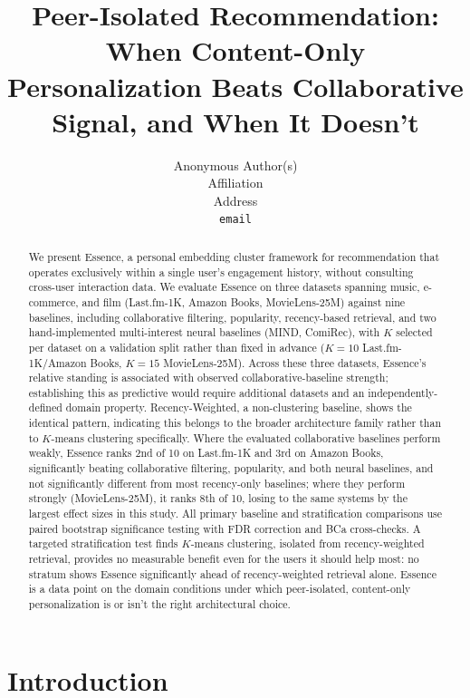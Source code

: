 \documentclass{article}
\title{Peer-Isolated Recommendation: When Content-Only Personalization Beats Collaborative Signal, and When It Doesn't\footnotemark}
\author{%
  Anonymous Author(s) \\
  Affiliation \\
  Address \\
  \texttt{email}
}
\begin{document}
\maketitle
{}

\begin{abstract}
We present Essence, a personal embedding cluster framework for recommendation that operates exclusively within a single user's engagement history, without consulting cross-user interaction data. We evaluate Essence on three datasets spanning music, e-commerce, and film (Last.fm-1K, Amazon Books, MovieLens-25M) against nine baselines, including collaborative filtering, popularity, recency-based retrieval, and two hand-implemented multi-interest neural baselines (MIND, ComiRec), with $K$ selected per dataset on a validation split rather than fixed in advance ($K=10$ Last.fm-1K/Amazon Books, $K=15$ MovieLens-25M). Across these three datasets, Essence's relative standing is associated with observed collaborative-baseline strength; establishing this as predictive would require additional datasets and an independently-defined domain property. Recency-Weighted, a non-clustering baseline, shows the identical pattern, indicating this belongs to the broader architecture family rather than to $K$-means clustering specifically. Where the evaluated collaborative baselines perform weakly, Essence ranks 2nd of 10 on Last.fm-1K and 3rd on Amazon Books, significantly beating collaborative filtering, popularity, and both neural baselines, and not significantly different from most recency-only baselines; where they perform strongly (MovieLens-25M), it ranks 8th of 10, losing to the same systems by the largest effect sizes in this study. All primary baseline and stratification comparisons use paired bootstrap significance testing with FDR correction and BCa cross-checks. A targeted stratification test finds $K$-means clustering, isolated from recency-weighted retrieval, provides no measurable benefit even for the users it should help most: no stratum shows Essence significantly ahead of recency-weighted retrieval alone. Essence is a data point on the domain conditions under which peer-isolated, content-only personalization is or isn't the right architectural choice.
\end{abstract}

\section{Introduction}
\label{sec:intro}
\end{document}

